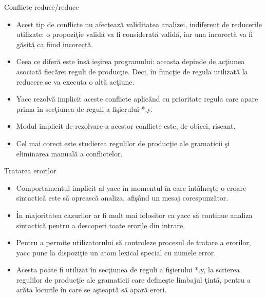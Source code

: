 \documentclass[pdf]{beamer}
\begin{document}
\begin{frame}{Conflicte reduce/reduce}
\begin{itemize}
	\item
	Acest tip de conflicte nu afectează validitatea analizei, indiferent de reducerile utilizate: o propoziţie validă va fi considerată validă, iar una incorectă va fi găsită ca fiind incorectă.

	\item
	Ceea ce diferă este însă ieşirea programului: aceasta depinde de acţiunea asociată fiecărei reguli de producţie. Deci, în funcţie de regula utilizată la reducere se va executa o altă acţiune.

	\item
	Yacc rezolvă implicit aceste conflicte aplicând cu prioritate regula care apare prima în secţiunea de reguli a fişierului *.y.

	\item
	Modul implicit de rezolvare a acestor conflicte este, de obicei, riscant.

	\item
	Cel mai corect este studierea regulilor de producţie ale gramaticii şi eliminarea manuală a conflictelor.

\end{itemize}
\end{frame}



\begin{frame}{Tratarea erorilor}
\begin{itemize}
	\item
	Comportamentul implicit al yacc în momentul în care întâlneşte o eroare sintactică este să oprească analiza, afişând un mesaj corespunzător.

	\item
	În majoritatea cazurilor ar fi mult mai folositor ca yacc să continue analiza sintactică pentru a descoperi toate erorile din intrare.

	\item
	Pentru a permite utilizatorului să controleze procesul de tratare a erorilor, yacc pune la dispoziţie un atom lexical special cu numele {\color{red}error}.

	\item
	Acesta poate fi utilizat în secţiunea de reguli a fişierului *.y, la scrierea regulilor de producţie ale gramaticii care defineşte limbajul ţintă, pentru a arăta locurile în care se aşteaptă să apară erori.

\end{itemize}
\end{frame}
\end{document}
